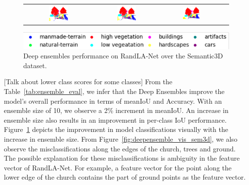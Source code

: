 \begin{figure}[h!]
\begin{tabular}{cccc}
            \includegraphics[width=0.30\textwidth, height=0.15\textheight]{images/seg_output/deep_ensembles/2_1.png} &
            \includegraphics[width=0.30\textwidth, height=0.15\textheight]{images/seg_output/deep_ensembles/2_5.png}& 
            \includegraphics[width=0.30\textwidth, height=0.15\textheight]{images/seg_output/deep_ensembles/2_10.png}\\
        \end{tabular}
        \includegraphics[scale=0.65]{images/legend.png}
        \caption{Deep ensembles performance on RandLA-Net over the Semantic3D dataset.}
        \label{fig:deepensemble_improv}
    \end{figure}

    [Talk about lower class scores for some classes]
    From the Table~\ref{tab:ensemble_eval}, we infer that the Deep Ensembles improve the model's overall performance in terms of meanIoU and Accuracy.
    With an ensemble size of 10, we observe a 2\% increment in meanIoU.
    An increase in ensemble size also results in an improvement in per-class IoU performance.
    Figure~\ref{fig:deepensemble_improv} depicts the improvement in model classifications visually with the increase in ensemble size.
    From Figure~\ref{fig:deepensemble_vis_sem3d}, we also observe the misclassifications along the edges of the church, trees and ground.
    The possible explanation for these misclassifications is ambiguity in the feature vector of RandLA-Net. For example, a feature vector for the point along the lower edge of the church contains the part of ground points as the feature vector.
